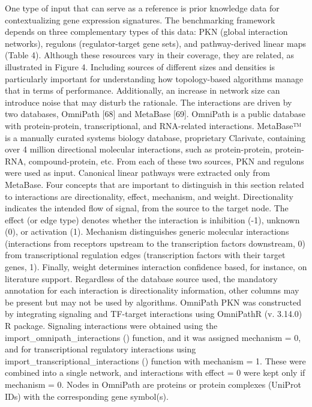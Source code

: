 One type of input that can serve as a reference is prior knowledge data for contextualizing gene expression signatures. 
The benchmarking framework depends on three complementary types of this data: 
PKN (global interaction networks), regulons (regulator-target gene sets), and pathway-derived linear maps (Table 4). 
Although these resources vary in their coverage, they are related, as illustrated in Figure 4. Including sources of different 
sizes and densities is particularly important for understanding how topology-based algorithms manage that in terms of performance. 
Additionally, an increase in network size can introduce noise that may disturb the rationale. 
The interactions are driven by two databases, OmniPath [68] and MetaBase [69].
OmniPath is a public database with protein-protein, transcriptional, and RNA-related interactions. MetaBase™ is a manually curated systems biology database, proprietary Clarivate, containing over 4 million directional molecular interactions, such as protein-protein, 
protein-RNA, compound-protein, etc. 
From each of these two sources, PKN and regulons were used as input. Canonical linear pathways were extracted only from MetaBase. 
Four concepts that are important to distinguish in this section related to interactions are directionality, effect, mechanism, and weight. 
Directionality indicates the intended flow of signal, from the source to the target node. The effect (or edge type) denotes whether the 
interaction is inhibition (-1), unknown (0), or activation (1). Mechanism distinguishes generic molecular interactions (interactions from 
receptors upstream to the transcription factors downstream, 0) from transcriptional regulation edges (transcription factors with their target genes, 1). 
Finally, weight determines interaction confidence based, for instance, on literature support. Regardless of the database source used, the mandatory
 annotation for each interaction is directionality information, other columns may be present but may not be used by algorithms. 
OmniPath PKN was constructed by integrating signaling and TF-target interactions using OmniPathR (v. 3.14.0) R package. Signaling interactions were obtained using the import_omnipath_interactions () function, and it was assigned mechanism = 0, and for transcriptional regulatory interactions using import_transcriptional_interactions () function with mechanism = 1.
These were combined into a single network, and interactions with effect = 0 were kept only if mechanism = 0. Nodes in OmniPath are proteins or protein complexes (UniProt IDs) with the corresponding gene symbol(s). 
